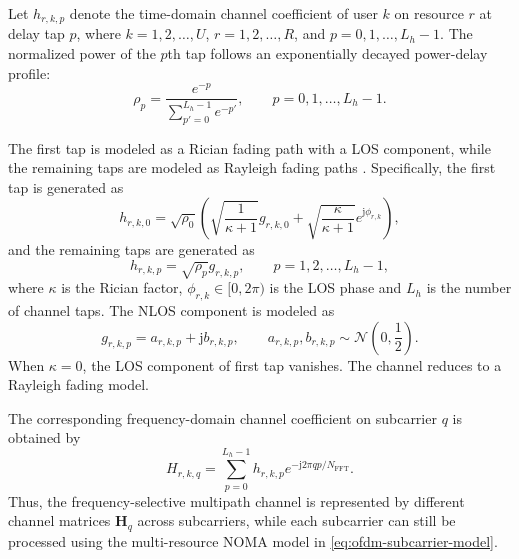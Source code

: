 Let $h_{r,k,p}$ denote the time-domain channel coefficient of user $k$ on resource $r$ at delay tap $p$, where $k=1,2,\ldots,U$, $r=1,2,\ldots,R$, and $p=0,1,\ldots,L_h-1$. The normalized power of the $p$th tap follows an exponentially decayed power-delay profile:
\begin{equation}
    \rho_p
    =
    \frac{e^{-p}}{\sum_{p'=0}^{L_h-1}e^{-p'}},
    \qquad
    p=0,1,\ldots,L_h-1.
    \label{eq:ofdm-power-delay-profile}
\end{equation}

The first tap is modeled as a Rician fading path with a LOS component, while the remaining taps are modeled as Rayleigh fading paths \cite{3gpp38900}. Specifically, the first tap is generated as
\begin{equation}
    h_{r,k,0}
    =
    \sqrt{\rho_0}
    \left(
    \sqrt{\frac{1}{\kappa+1}}g_{r,k,0}
    +
    \sqrt{\frac{\kappa}{\kappa+1}}e^{\mathrm{j}\phi_{r,k}}
    \right),
    \label{eq:ofdm-rician-first-tap}
\end{equation}
and the remaining taps are generated as
\begin{equation}
    h_{r,k,p}
    =
    \sqrt{\rho_p}g_{r,k,p},
    \qquad
    p=1,2,\ldots,L_h-1,
    \label{eq:ofdm-rayleigh-remaining-taps}
\end{equation}
where $\kappa$ is the Rician factor, $\phi_{r,k}\in[0,2\pi)$ is the LOS phase and $L_h$ is the number of channel taps. The NLOS component is modeled as
\begin{equation}
    g_{r,k,p}
    =
    a_{r,k,p}
    +
    \mathrm{j}b_{r,k,p},
    \qquad
    a_{r,k,p},b_{r,k,p}\sim\mathcal{N}\left(0,\frac{1}{2}\right).
    \label{eq:ofdm-nlos-component}
\end{equation}
When $\kappa=0$, the LOS component of first tap vanishes. The channel reduces to a Rayleigh fading model.

The corresponding frequency-domain channel coefficient on subcarrier $q$ is obtained by
\begin{equation}
    H_{r,k,q}
    =
    \sum_{p=0}^{L_h-1}
    h_{r,k,p}
    e^{-\mathrm{j}2\pi qp/N_{\mathrm{FFT}}}.
    \label{eq:ofdm-frequency-response}
\end{equation}
Thus, the frequency-selective multipath channel is represented by different channel matrices $\bm{H}_q$ across subcarriers, while each subcarrier can still be processed using the multi-resource NOMA model in \eqref{eq:ofdm-subcarrier-model}.


